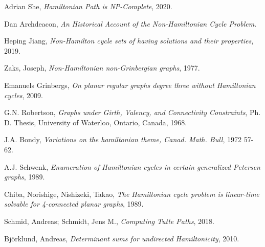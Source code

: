 \documentclass[14pt]{article}
\begin{document}
\begin{spacing}{1.175}
    \begin{thebibliography}{9}
        \item Adrian She, \emph{Hamiltonian Path is NP-Complete}, 2020.
        \item Dan Archdeacon, \emph{An Historical Account of the Non-Hamiltonian Cycle Problem}.
        \item Heping Jiang, \emph{Non-Hamilton cycle sets of having solutions and their properties}, 2019.
        \item Zaks, Joseph, \emph{Non-Hamiltonian non-Grinbergian graphs}, 1977.
        \item Emanuels Grinbergs, \emph{On planar regular graphs degree three without Hamiltonian cycles}, 2009.
        \item G.N. Robertson, \emph{Graphs under Girth, Valency, and Connectivity Constraints}, Ph. D. Thesis, University of Waterloo, Ontario, Canada, 1968.
        \item J.A. Bondy, \emph{Variations on the hamiltonian theme, Canad. Math. Bull}, 1972 57-62.
        \item A.J. Schwenk, \emph{Enumeration of Hamiltonian cycles in certain generalized Petersen graphs}, 1989.
        \item Chiba, Norishige, Nishizeki, Takao, \emph{The Hamiltonian cycle problem is linear-time solvable for 4-connected planar graphs}, 1989.
        \item Schmid, Andreas; Schmidt, Jens M., \emph{Computing Tutte Paths}, 2018.
        \item Björklund, Andreas, \emph{Determinant sums for undirected Hamiltonicity}, 2010.

    \end{thebibliography}


    
	\end{spacing}
 
\end{document}
